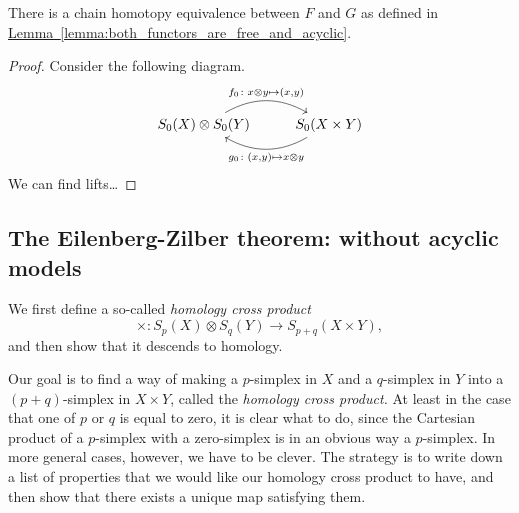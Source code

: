 \documentclass[main.tex]{subfiles}
\begin{document}
\begin{proposition}
  There is a chain homotopy equivalence between $F$ and $G$ as defined in \hyperref[lemma:both_functors_are_free_and_acyclic]{Lemma~\ref*{lemma:both_functors_are_free_and_acyclic}}.
\end{proposition}
\begin{proof}
  Consider the following diagram.
  \begin{equation*}
    \begin{tikzcd}
      S_{0}(X) \otimes S_{0}(Y)
      \arrow[r, bend left, "{f_{0}\colon x \otimes y \mapsto (x, y)}"]
      & S_{0}(X \times Y)
      \arrow[l, bend left, "{g_{0}\colon (x, y) \mapsto x \otimes y}"]
    \end{tikzcd}
  \end{equation*}
  We can find lifts\dots
\end{proof}

\subsection{The Eilenberg-Zilber theorem: without acyclic models}
\label{ssc:eilenberg_zilber_without_acyclic_models}

We first define a so-called \emph{homology cross product}
\begin{equation*}
  \times\colon S_{p}(X) \otimes S_{q}(Y) \to S_{p+q}(X \times Y),
\end{equation*}
and then show that it descends to homology.

Our goal is to find a way of making a $p$-simplex in $X$ and a $q$-simplex in $Y$ into a $(p+q)$-simplex in $X \times Y$, called the \emph{homology cross product.} At least in the case that one of $p$ or $q$ is equal to zero, it is clear what to do, since the Cartesian product of a $p$-simplex with a zero-simplex is in an obvious way a $p$-simplex. In more general cases, however, we have to be clever. The strategy is to write down a list of properties that we would like our homology cross product to have, and then show that there exists a unique map satisfying them.
\end{document}
